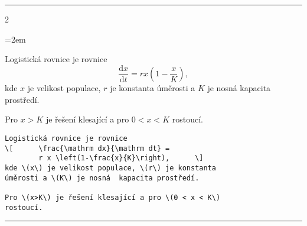 \documentclass[10pt]{article}
\begin{document}
\hrule
\begin{multicols}2

  \begin{minipage}{1.0\linewidth}
    \parindent=2em

Logistická rovnice je rovnice
\[
\frac{\mathrm dx}{\mathrm dt} =
r x \left(1-\frac{x}{K}\right),
\]
kde \(x\) je velikost populace, 
\(r\) je konstanta úměrosti a  
\(K\) je nosná  kapacita prostředí.

Pro \(x > K\) je řešení klesající 
a pro \(0 < x< K\) rostoucí.

  \end{minipage}

\columnbreak
  
\begin{lstlisting}
Logistická rovnice je rovnice
\[      \frac{\mathrm dx}{\mathrm dt} = 
        r x \left(1-\frac{x}{K}\right),      \]
kde \(x\) je velikost populace, \(r\) je konstanta 
úměrosti a \(K\) je nosná  kapacita prostředí.

Pro \(x>K\) je řešení klesající a pro \(0 < x < K\) 
rostoucí.
\end{lstlisting}

\end{multicols}

\hrule
\end{document}
